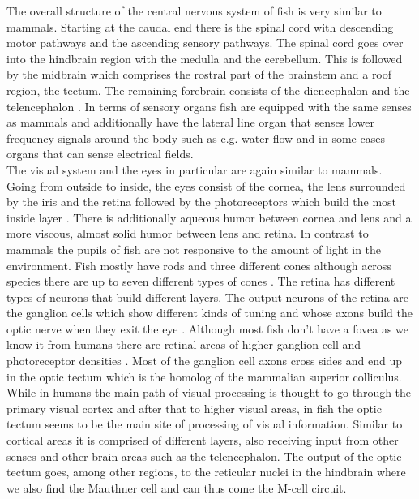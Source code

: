 	The overall structure of the central nervous system of fish is very similar to mammals.
	Starting at the caudal end there is the spinal cord with descending motor pathways and the 
	ascending sensory pathways.
	The spinal cord goes over into the hindbrain region with the medulla and the cerebellum.
	This is followed by the midbrain which comprises the rostral part of the brainstem and a roof 
	region, the tectum.
	The remaining forebrain consists of the diencephalon and the telencephalon \citep{Butler2011}.
	In terms of sensory organs fish are equipped with the same senses as mammals and additionally 
	have the lateral line organ that senses lower frequency signals around the body such as e.g. 
	water flow and in some cases organs that can sense electrical fields.\\
    The visual system and the eyes in particular are again similar to mammals.
	Going from outside to inside, the eyes consist of the cornea, the lens surrounded by the iris and the retina followed by the photoreceptors which build the most inside layer \citep{Kroeger2011}.
    There is additionally aqueous humor between cornea and lens and a more viscous, almost solid humor between lens and retina.
	In contrast to mammals the pupils of fish are not responsive to the amount of light in the 
	environment.
	Fish mostly have rods and three different cones although across species there are up to seven 
	different types of cones \citep[Chapter~7]{Cronin2017}.
	The retina has different types of neurons that build different layers.
	The output neurons of the retina are the ganglion cells which show different kinds of tuning \citep{Antinucci2018}
	and whose axons build the optic nerve when they exit the eye \citep{Levine2011}.
	Although most fish don't have a fovea as we know it from humans there are retinal areas of 
	higher ganglion cell and photoreceptor densities \citep{Pita2015}.
	Most of the ganglion cell axons cross sides and end up in the optic tectum which is the 
	homolog of the mammalian superior colliculus.
	While in humans the main path of visual processing is thought to go through the primary visual cortex and after that to higher visual areas, in fish the optic tectum seems to be the main site of processing of visual information.
	Similar to cortical areas it is comprised of different layers, also receiving input from other 
	senses and other brain areas such as the telencephalon.
	The output of the optic tectum goes, among other regions, to the reticular nuclei in the 
	hindbrain where we also find the Mauthner cell and can thus come the M-cell circuit.\\
